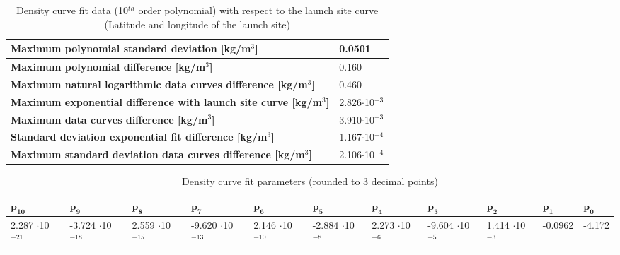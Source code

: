 \begin{table}[!ht]
\begin{center}
\caption{Density curve fit data (10$^{th}$ order polynomial) with respect to the launch site curve (Latitude and longitude of the launch site)}
\label{tab:fitDeviationsDen}
\begin{tabular}{|l|l|}
\hline 
\textbf{Maximum polynomial standard deviation [kg/m$^{3}$]} & 0.0501 \\ \hline

  \textbf{Maximum polynomial difference [kg/m$^{3}$]} & 0.160 \\ \hline
  
   \textbf{Maximum natural logarithmic data curves difference [kg/m$^{3}$]} & 0.460 \\ \hline
  
    \textbf{Maximum exponential difference with launch site curve [kg/m$^{3}$]} & 2.826$\cdot$10$^{-3}$ \\ \hline
    
       \textbf{Maximum data curves difference [kg/m$^{3}$]} & 3.910$\cdot$10$^{-3}$ \\ \hline
    
      \textbf{Standard deviation exponential fit difference [kg/m$^{3}$]} & 1.167$\cdot$10$^{-4}$ \\ \hline 
      
           \textbf{Maximum standard deviation data curves difference [kg/m$^{3}$]} & 2.106$\cdot$10$^{-4}$ \\ \hline
\end{tabular}
\end{center}
\end{table}



\begin{table}[!ht]
\begin{center}
\caption{Density curve fit parameters (rounded to 3 decimal points)}
\label{tab:fitParametersDen}
\begin{tabular}{|p{1.1cm}|p{1.1cm}|p{1.1cm}|p{1.1cm}|p{1.1cm}|p{1.1cm}|p{1.1cm}|p{1.1cm}|p{1.1cm}|p{1.1cm}|p{1.1cm}|}
\hline 
 $\mathbf{p_{10}}$ & $\mathbf{p_{9}}$ & $\mathbf{p_{8}}$ & $\mathbf{p_{7}}$ & $\mathbf{p_{6}}$ & $\mathbf{p_{5}}$ & $\mathbf{p_{4}}$ & $\mathbf{p_{3}}$ & $\mathbf{p_{2}}$ & $\mathbf{p_{1}}$ & $\mathbf{p_{0}}$ \\ \hline 
2.287 $\cdot$10$^{-21}$  & -3.724 $\cdot$10$^{-18}$ & 2.559 $\cdot$10$^{-15}$ & -9.620 $\cdot$10$^{-13}$ & 2.146 $\cdot$10$^{-10}$ & -2.884 $\cdot$10$^{-8}$ & 2.273 $\cdot$10$^{-6}$ & -9.604 $\cdot$10$^{-5}$ & 1.414 $\cdot$10$^{-3}$ & -0.0962 & -4.172\\ \hline
\end{tabular}
\end{center}
\end{table}

